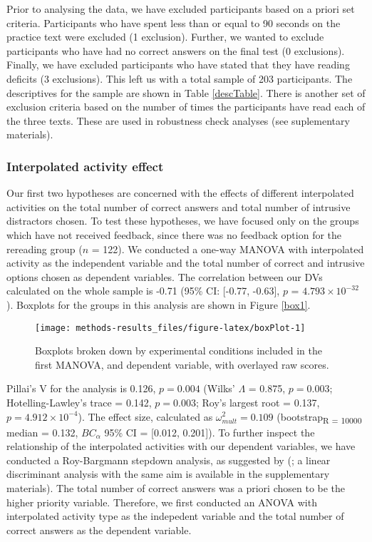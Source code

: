\documentclass[11pt,]{article}
\begin{document}
Prior to analysing the data, we have excluded participants based on a
priori set criteria. Participants who have spent less than or equal to
90 seconds on the practice text were excluded (1 exclusion). Further, we
wanted to exclude participants who have had no correct answers on the
final test (0 exclusions). Finally, we have excluded participants who
have stated that they have reading deficits (3 exclusions). This left us
with a total sample of 203 participants. The descriptives for the sample
are shown in Table \ref{descTable}. There is another set of exclusion
criteria based on the number of times the participants have read each of
the three texts. These are used in robustness check analyses (see
suplementary materials).

\hypertarget{interpolated-activity-effect}{%
\subsubsection{Interpolated activity
effect}\label{interpolated-activity-effect}}

Our first two hypotheses are concerned with the effects of different
interpolated activities on the total number of correct answers and total
number of intrusive distractors chosen. To test these hypotheses, we
have focused only on the groups which have not received feedback, since
there was no feedback option for the rereading group (\(n\) = 122). We
conducted a one-way MANOVA with interpolated activity as the independent
variable and the total number of correct and intrusive options chosen as
dependent variables. The correlation between our DVs calculated on the
whole sample is -0.71 (95\% CI: {[}-0.77, -0.63{]}, \(p\) =
\(4.793\times 10^{-32}\)). Boxplots for the groups in this analysis are
shown in Figure \ref{box1}.

\begin{figure*}[h]

{\centering \texttt{[image: methods-results\_files/figure-latex/boxPlot-1]} 

}

\caption{\label{box1} Boxplots broken down by experimental conditions included in the first MANOVA, and dependent variable, with overlayed raw scores.}\label{fig:boxPlot}
\end{figure*}

Pillai's V for the analysis is 0.126, \(p = 0.004\) (Wilks' \(\Lambda\)
= 0.875, \(p = 0.003\); Hotelling-Lawley's trace = 0.142, \(p = 0.003\);
Roy's largest root = 0.137, \(p = 4.912\times 10^{-4}\)). The effect
size, calculated as \(\omega^2_{mult} = 0.109\)
(bootstrap\textsubscript{R = 10000} median = 0.132, \(BC_\alpha\) 95\%
CI = {[}0.012, 0.201{]}). To further inspect the relationship of the
interpolated activities with our dependent variables, we have conducted
a Roy-Bargmann stepdown analysis, as suggested by
\citeauthor{tabachnick_using_2012} (\citeyear{tabachnick_using_2012}; a
linear discriminant analysis with the same aim is available in the
supplementary materials). The total number of correct answers was a
priori chosen to be the higher priority variable. Therefore, we first
conducted an ANOVA with interpolated activity type as the indepedent
variable and the total number of correct answers as the dependent
variable.
\end{document}
